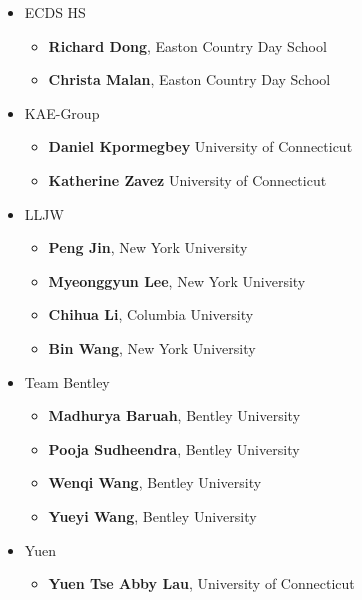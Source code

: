 
\begin{itemize}
\item ECDS HS
  \begin{itemize}
  \item \textbf{Richard Dong}, Easton Country Day School
  \item \textbf{Christa Malan}, Easton Country Day School
  \end{itemize}
\item KAE-Group
  \begin{itemize}
  \item \textbf{Daniel Kpormegbey} University of Connecticut
  \item \textbf{Katherine Zavez} University of Connecticut
  \end{itemize}
\item LLJW
  \begin{itemize}
  \item \textbf{Peng Jin}, New York University
  \item \textbf{Myeonggyun Lee}, New York University
  \item \textbf{Chihua Li}, Columbia University
  \item \textbf{Bin Wang}, New York University
  \end{itemize}
\item Team Bentley
  \begin{itemize}
  \item \textbf{Madhurya Baruah}, Bentley University
  \item \textbf{Pooja Sudheendra}, Bentley University
  \item \textbf{Wenqi Wang}, Bentley University
  \item \textbf{Yueyi Wang}, Bentley University
  \end{itemize}
\item Yuen
  \begin{itemize}
  \item \textbf{Yuen Tse Abby Lau}, University of Connecticut
  \end{itemize}
\end{itemize}




